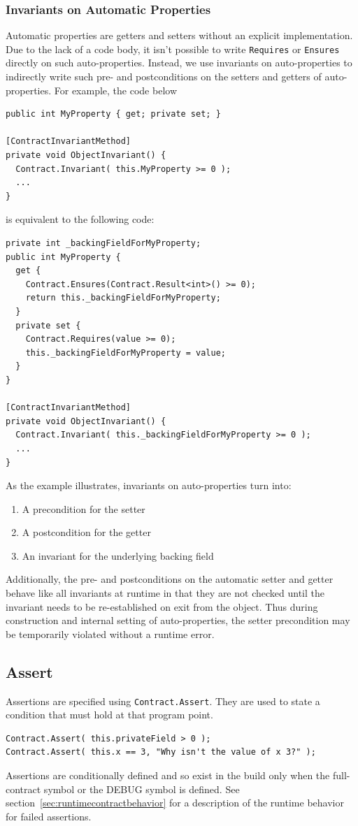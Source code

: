 \documentclass{article}
\newcommand{\code}[1]{\lstinline{#1}}
\begin{document}
\subsubsection{Invariants on Automatic Properties}
\label{sec:autoprop}
Automatic properties are getters and setters without an explicit
implementation. Due to the lack of a code body, it isn't possible to write
\code{Requires} or \code{Ensures} directly on such
auto-properties.
Instead, we use invariants on auto-properties to indirectly write such pre- and
postconditions on the setters and getters of auto-properties. For
example, the code below
\begin{lstlisting}
public int MyProperty { get; private set; }

[ContractInvariantMethod]
private void ObjectInvariant() {
  Contract.Invariant( this.MyProperty >= 0 );
  ...
}
\end{lstlisting}
is equivalent to the following code:
\begin{lstlisting}
private int _backingFieldForMyProperty;
public int MyProperty {
  get {
    Contract.Ensures(Contract.Result<int>() >= 0);
    return this._backingFieldForMyProperty;
  }
  private set {
    Contract.Requires(value >= 0);
    this._backingFieldForMyProperty = value;
  }
}

[ContractInvariantMethod]
private void ObjectInvariant() {
  Contract.Invariant( this._backingFieldForMyProperty >= 0 );
  ...
}
\end{lstlisting}
As the example illustrates, invariants on auto-properties turn into:
\begin{enumerate}
\item A precondition for the setter
\item A postcondition for the getter
\item An invariant for the underlying backing field
\end{enumerate}
Additionally, the pre- and postconditions on the automatic setter and
getter behave like all invariants at runtime in that they are not
checked until the invariant needs to be re-established on exit from the
object. Thus during construction and internal setting of
auto-properties, the setter precondition may be temporarily violated
without a runtime error.

\subsection{Assert}
Assertions are specified using \code{Contract.Assert}. They are
used to state a condition that must hold at that program point.
\begin{lstlisting}
Contract.Assert( this.privateField > 0 );
Contract.Assert( this.x == 3, "Why isn't the value of x 3?" );
\end{lstlisting}
Assertions are conditionally defined and so exist in the build
only when the full-contract symbol or the DEBUG symbol is
defined. See section~\ref{sec:runtimecontractbehavior} for a
description of the runtime behavior for failed assertions.
\end{document}
